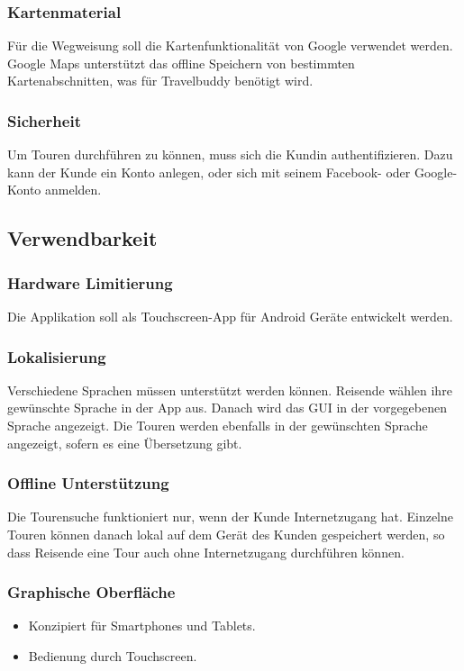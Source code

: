 \documentclass[a4paper,10pt,xetex]{article}
\begin{document}
\subsubsection{Kartenmaterial}\label{kartenmaterial}
Für die Wegweisung soll die Kartenfunktionalität von Google verwendet
werden. Google Maps unterstützt das offline Speichern von bestimmten
Kartenabschnitten, was für Travelbuddy benötigt wird.


\subsubsection{Sicherheit}\label{sicherheit}
Um Touren durchführen zu können, muss sich die Kundin authentifizieren.
Dazu kann der Kunde ein Konto anlegen, oder sich mit seinem Facebook-
oder Google-Konto anmelden.


\subsection{Verwendbarkeit}\label{verwendbarkeit}
\subsubsection{Hardware Limitierung}\label{hardware-limitierung}
Die Applikation soll als Touchscreen-App für Android Geräte entwickelt
werden.


\subsubsection{Lokalisierung}\label{lokalisierung}
Verschiedene Sprachen müssen unterstützt werden können. Reisende wählen
ihre gewünschte Sprache in der App aus. Danach wird das GUI in der
vorgegebenen Sprache angezeigt. Die Touren werden ebenfalls in der
gewünschten Sprache angezeigt, sofern es eine Übersetzung gibt.


\subsubsection{Offline Unterstützung}\label{offline-unterstuxfctzung}
Die Tourensuche funktioniert nur, wenn der Kunde Internetzugang hat.
Einzelne Touren können danach lokal auf dem Gerät des Kunden gespeichert
werden, so dass Reisende eine Tour auch ohne Internetzugang durchführen
können.


\subsubsection{Graphische Oberfläche}\label{graphische-oberfluxe4che}
\begin{itemize}
  \item Konzipiert für Smartphones und Tablets.
  \item Bedienung durch Touchscreen.
\end{itemize}
\end{document}
